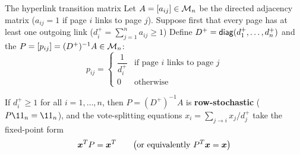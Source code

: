 \documentclass[aspectratio=169]{beamer}\usepackage[]{graphicx}\usepackage[]{xcolor}
\begin{document}
\begin{frame}{The hyperlink transition matrix}
Let $A = [a_{ij}] \in \mathcal{M}_n$ be the directed adjacency matrix ($a_{ij} = 1$ if page $i$ links to page $j$). Suppose first that every page has at least one outgoing link ($d_i^+ = \sum_{j=1}^n a_{ij} \ge 1$)
\vfill
Define $D^+ = \mathsf{diag}(d_1^+, \ldots, d_n^+)$ and the  $P = [p_{ij}] = (D^+)^{-1} A \in \mathcal{M}_n$:
\[
p_{ij} = \begin{cases}
\dfrac{1}{d_i^+} & \text{if page } i \text{ links to page } j \\
0 & \text{otherwise}
\end{cases}
\]
\vfill
\begin{proposition}
If $d_i^+ \ge 1$ for all $i = 1, \ldots, n$, then $P = (D^+)^{-1} A$ is \textbf{row-stochastic} ($P\11_n = \11_n$), and the vote-splitting equations $x_i = \sum_{j \to i} x_j / d_j^+$ take the fixed-point form
\[
\bm{x}^T P = \bm{x}^T \qquad \bigl(\text{or equivalently } P^T \bm{x} = \bm{x}\bigr)
\]
\end{proposition}
\end{frame}


\end{document}
